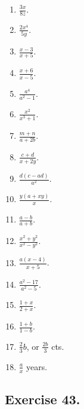 \documentclass{book}
\begin{document}
\begin{enumerate}
\item $\displaystyle \frac{3x}{8z}$.

\item $\displaystyle \frac{2x^4}{5y}$.

\item $\displaystyle \frac{x-3}{x+5}$.

\item $\displaystyle \frac{x+6}{x-5}$.

\item $\displaystyle \frac{a^4}{a^2-1}$.

\item $\displaystyle \frac{x^2}{x^3+1}$.

\item $\displaystyle \frac{m+n}{a+2b}$.

\item $\displaystyle \frac{c+d}{x+2y}$.

\item $\displaystyle \frac{d(c-ad)}{a^2}$.

\item $\displaystyle \frac{y(a+xy)}{x}$.

\item $\displaystyle \frac{a-b}{a+b}$.

\item $\displaystyle \frac{x^2+y^2}{x^2-y^2}$.

 \item $\displaystyle \frac{a(x - 4)}{x + 5}$.

 \item $\displaystyle \frac{a^2 - 17}{a^2 - 5}$.

 \item $\displaystyle \frac{1 + x}{2 + x}$.

 \item $\displaystyle \frac{1 + b}{1 - b}$.

\item $\displaystyle \frac{2}{3}b$, or $\displaystyle
\frac{2b}{3}$ cts.

\item $\displaystyle \frac{a}{x}$ years.
\end{enumerate}

\subsection*{Exercise 43.}
\end{document}

